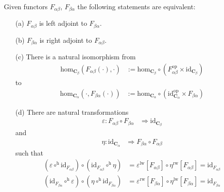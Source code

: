 \begin{thm}
\label{thm:adjoints}
Given functors $F_{\alpha\beta}$, $F_{\beta\alpha}$ the following statements are equivalent:
\begin{enumerate}
\item[(a)]
$F_{\alpha\beta}$ is left adjoint to $F_{\beta\alpha}$.
\item[(b)]
$F_{\beta\alpha}$ is right adjoint to $F_{\alpha\beta}$.
\item[(c)]
There is a natural isomorphism from
\begin{align*}
  \mathrm{hom}_{\mathbf{C}_{\beta}}(F_{\alpha\beta}(\cdot),\cdot)
  &:=
  \mathrm{hom}_{\mathbf{C}_{\beta}}
  \circ
  \left(
    F_{\alpha\beta}^{\mathrm{op}}
    \times
    \mathrm{id}_{\mathbf{C}_{\beta}}
  \right)
\end{align*}
to
\begin{align*}
  \mathrm{hom}_{\mathbf{C}_{\alpha}}(\cdot,F_{\beta\alpha}(\cdot))
  &:=
  \mathrm{hom}_{\mathbf{C}_{\alpha}}
  \circ
  \left(
    \mathrm{id}_{\mathbf{C}_{\alpha}}^{\mathrm{op}}
    \times
    F_{\beta\alpha}
  \right)
\end{align*}
\item[(d)]
There are natural transformations
\begin{align*}
  \varepsilon
  \colon
  F_{\alpha\beta}
  \circ
  F_{\beta\alpha}
  &\Rightarrow
  \mathrm{id}_{\mathbf{C}_{\beta}}
\end{align*}
and
\begin{align*}
  \eta
  \colon
  \mathrm{id}_{\mathbf{C}_{\alpha}}
  &\Rightarrow
  F_{\beta\alpha}
  \circ
  F_{\alpha\beta}
\end{align*}
such that
\begin{align*}
  \left(
    \varepsilon
    \circ^{\textrm{h}}
    \mathrm{id}_{F_{\alpha\beta}}
  \right)
  \circ
  \left(
    \mathrm{id}_{F_{\alpha\beta}}
    \circ^{\textrm{h}}
    \eta
  \right)
  &=
  \varepsilon^{\textrm{lw}}[F_{\alpha\beta}]
  \circ
  \eta^{\textrm{rw}}[F_{\alpha\beta}]
  =
  \mathrm{id}_{F_{\alpha\beta}}
  \\
  \left(
    \mathrm{id}_{F_{\beta\alpha}}
    \circ^{\textrm{h}}
    \varepsilon
  \right)
  \circ
  \left(
    \eta
    \circ^{\textrm{h}}
    \mathrm{id}_{F_{\beta\alpha}}
  \right)
  &=
  \varepsilon^{\textrm{rw}}[F_{\beta\alpha}]
  \circ
  \eta^{\textrm{lw}}[F_{\beta\alpha}]
  =
  \mathrm{id}_{F_{\beta\alpha}}
\end{align*}
\end{enumerate}
\end{thm}
